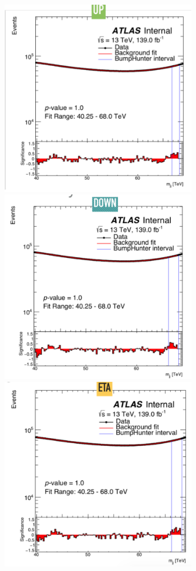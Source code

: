 \begin{figure}[!htb]
    \begin{center}
        \includegraphics[width=0.75\textwidth]{figures/chapter_dimuon/UpVariation}
        \includegraphics[width=0.75\textwidth]{figures/chapter_dimuon/DownVariation}
        \includegraphics[width=0.75\textwidth]{figures/chapter_dimuon/EtaVariation}

\end{center}
\end{figure}

